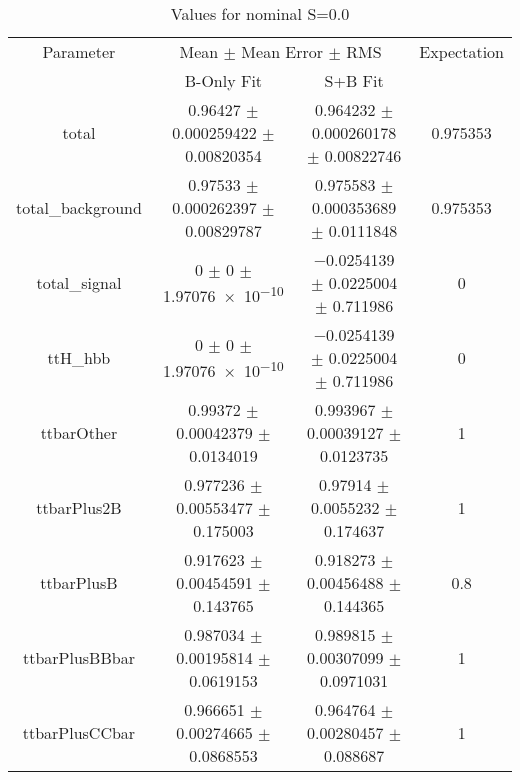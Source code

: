 \begin{table}
\centering
\caption{Values for nominal S=0.0}
\begin{tabular}{cccc}
\toprule
Parameter & \multicolumn{2}{c}{Mean $\pm$ Mean Error $\pm$ RMS} & Expectation\\
 & B-Only Fit & S+B Fit & \\
\midrule
total & \num{0.96427} $\pm$ \num{0.000259422} $\pm$ \num{0.00820354} & \num{0.964232} $\pm$ \num{0.000260178} $\pm$ \num{0.00822746} & \num{0.975353}\\
total\_background & \num{0.97533} $\pm$ \num{0.000262397} $\pm$ \num{0.00829787} & \num{0.975583} $\pm$ \num{0.000353689} $\pm$ \num{0.0111848} & \num{0.975353}\\
total\_signal & \num{0} $\pm$ \num{0} $\pm$ \num{1.97076e-10} & \num{-0.0254139} $\pm$ \num{0.0225004} $\pm$ \num{0.711986} & \num{0}\\
ttH\_hbb & \num{0} $\pm$ \num{0} $\pm$ \num{1.97076e-10} & \num{-0.0254139} $\pm$ \num{0.0225004} $\pm$ \num{0.711986} & \num{0}\\
ttbarOther & \num{0.99372} $\pm$ \num{0.00042379} $\pm$ \num{0.0134019} & \num{0.993967} $\pm$ \num{0.00039127} $\pm$ \num{0.0123735} & \num{1}\\
ttbarPlus2B & \num{0.977236} $\pm$ \num{0.00553477} $\pm$ \num{0.175003} & \num{0.97914} $\pm$ \num{0.0055232} $\pm$ \num{0.174637} & \num{1}\\
ttbarPlusB & \num{0.917623} $\pm$ \num{0.00454591} $\pm$ \num{0.143765} & \num{0.918273} $\pm$ \num{0.00456488} $\pm$ \num{0.144365} & \num{0.8}\\
ttbarPlusBBbar & \num{0.987034} $\pm$ \num{0.00195814} $\pm$ \num{0.0619153} & \num{0.989815} $\pm$ \num{0.00307099} $\pm$ \num{0.0971031} & \num{1}\\
ttbarPlusCCbar & \num{0.966651} $\pm$ \num{0.00274665} $\pm$ \num{0.0868553} & \num{0.964764} $\pm$ \num{0.00280457} $\pm$ \num{0.088687} & \num{1}\\
\bottomrule
\end{tabular}
\end{table}
